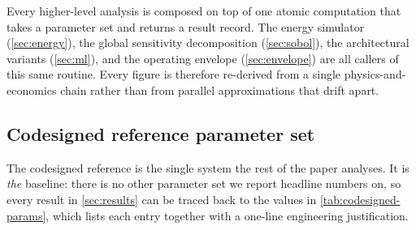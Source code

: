 \documentclass[11pt,a4paper]{article}
\begin{document}
Every higher-level analysis is composed on top of one atomic computation that takes a parameter set and returns a result record. The energy simulator (\cref{sec:energy}), the global sensitivity decomposition (\cref{sec:sobol}), the architectural variants (\cref{sec:ml}), and the operating envelope (\cref{sec:envelope}) are all callers of this same routine. Every figure is therefore re-derived from a single physics-and-economics chain rather than from parallel approximations that drift apart.

\subsection{Codesigned reference parameter set}\label{sec:codesigned-ref}

The codesigned reference is the single system the rest of the paper analyses. It is \emph{the} baseline: there is no other parameter set we report headline numbers on, so every result in \cref{sec:results} can be traced back to the values in \cref{tab:codesigned-params}, which lists each entry together with a one-line engineering justification.
\end{document}
